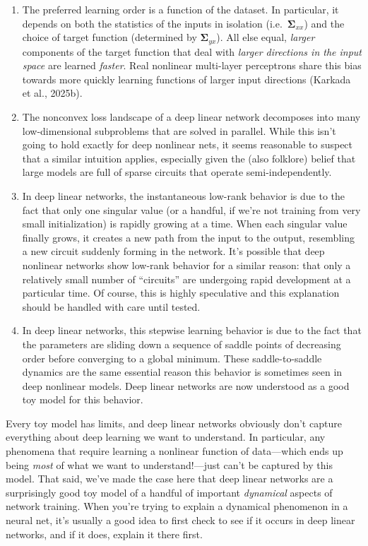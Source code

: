 \documentclass[12pt]{article}
\newcommand{\mSigma}{\boldsymbol{\Sigma}}
\begin{document}
\begin{enumerate}
    \item The preferred learning order is a function of the dataset. In particular, it depends on both the statistics of the inputs in isolation (i.e.\ $\mSigma_{xx}$) and the choice of target function (determined by $\mSigma_{yx}$). All else equal, \emph{larger} components of the target function that deal with \emph{larger directions in the input space} are learned \emph{faster}. Real nonlinear multi-layer perceptrons share this bias towards more quickly learning functions of larger input directions (Karkada et al., 2025b).

    \item The nonconvex loss landscape of a deep linear network decomposes into many low-dimensional subproblems that are solved in parallel. While this isn't going to hold exactly for deep nonlinear nets, it seems reasonable to suspect that a similar intuition applies, especially given the (also folklore) belief that large models are full of sparse circuits that operate semi-independently.

    \item In deep linear networks, the instantaneous low-rank behavior is due to the fact that only one singular value (or a handful, if we're not training from very small initialization) is rapidly growing at a time. When each singular value finally grows, it creates a new path from the input to the output, resembling a new circuit suddenly forming in the network. It's possible that deep nonlinear networks show low-rank behavior for a similar reason: that only a relatively small number of ``circuits'' are undergoing rapid development at a particular time. Of course, this is highly speculative and this explanation should be handled with care until tested.

    \item In deep linear networks, this stepwise learning behavior is due to the fact that the parameters are sliding down a sequence of saddle points of decreasing order before converging to a global minimum. These saddle-to-saddle dynamics are the same essential reason this behavior is sometimes seen in deep nonlinear models. Deep linear networks are now understood as a good toy model for this behavior.
\end{enumerate}

Every toy model has limits, and deep linear networks obviously don't capture everything about deep learning we want to understand. In particular, any phenomena that require learning a nonlinear function of data---which ends up being \emph{most} of what we want to understand!---just can't be captured by this model. That said, we've made the case here that deep linear networks are a surprisingly good toy model of a handful of important \emph{dynamical} aspects of network training. When you're trying to explain a dynamical phenomenon in a neural net, it's usually a good idea to first check to see if it occurs in deep linear networks, and if it does, explain it there first.
\end{document}
